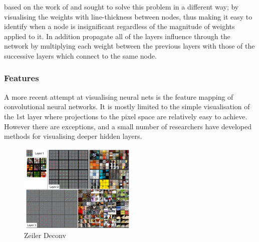 \documentclass[a4paper,11pt,titlepage]{article}
\begin{document}
	\cite{Tzeng2005} based on the work of 	\cite{Garson1991} and \cite{Goh1995} sought to solve this problem in a different way; by visualising the weights with line-thickness between nodes, thus making it easy to identify when a node is insignificant regardless of the magnitude of weights applied to it. In addition 	\cite{Tzeng2005} propagate all of the layers influence through the network by multiplying each weight between the previous layers with those of the successive layers which connect to the same node.
	 
\subsubsection{Features}

		A more recent attempt at visualising neural nets is the feature mapping of convolutional neural networks. It is mostly limited to the simple visualisation of the 1st layer where projections to the pixel space are relatively easy to achieve. However there are exceptions, and a small number of researchers have developed methods for visualising deeper hidden layers.
		
		\begin{figure}[H]
			\centering	
    			\includegraphics[width=0.5\textwidth]{img/zeiler_deconv.png} 
    			\caption{Zeiler Deconv}%
 		\end{figure}
 		
\end{document}
